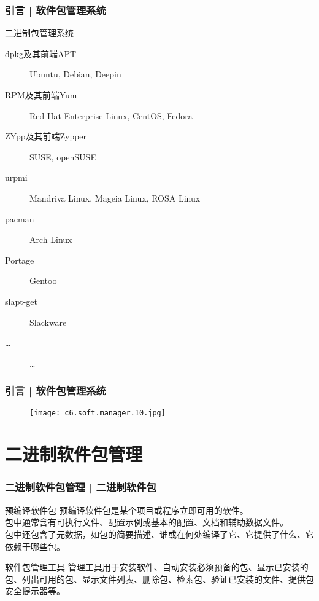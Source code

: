 \begin{frame}
  \frametitle{引言 | 软件包管理系统}
  \begin{block}{\alert{二进制包管理系统}}
    \begin{description}
      \item[dpkg及其前端APT] Ubuntu, Debian, Deepin
      \item[RPM及其前端Yum] Red Hat Enterprise Linux, CentOS, Fedora
      \item[ZYpp及其前端Zypper] SUSE, openSUSE
      \item[urpmi] Mandriva Linux, Mageia Linux, ROSA Linux
      \item[pacman] Arch Linux
      \item[Portage] Gentoo
      \item[slapt-get] Slackware
      \item[\ldots] \ldots
    \end{description}
  \end{block}
\end{frame}

\begin{frame}
  \frametitle{引言 | 软件包管理系统}
  \begin{figure}
    \centering
    \texttt{[image: c6.soft.manager.10.jpg]}
  \end{figure}
\end{frame}

\section{二进制软件包管理}
\begin{frame}
  \frametitle{二进制软件包管理 | 二进制软件包}
  \begin{block}{预编译软件包}
    预编译软件包是某个项目或程序立即可用的软件。\\
    包中通常含有可执行文件、配置示例或基本的配置、文档和辅助数据文件。\\
    包中还包含了元数据，如包的简要描述、谁或在何处编译了它、它提供了什么、它依赖于哪些包。
  \end{block}
  \pause
  \begin{block}{软件包管理工具}
    管理工具用于安装软件、自动安装必须预备的包、显示已安装的包、列出可用的包、显示文件列表、删除包、检索包、验证已安装的文件、提供包安全提示器等。
  \end{block}
\end{frame}

